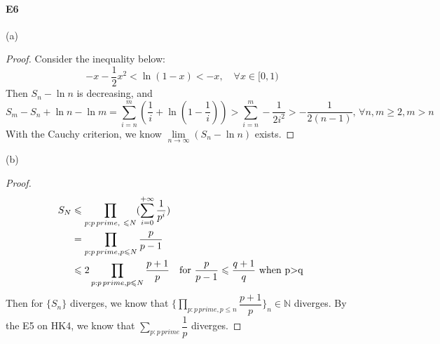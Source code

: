 \documentclass{article}
\begin{document}
\paragraph{E6}
(a)\begin{proof}
    Consider the inequality below:
    \[-x-\frac{1}{2}x^2<\ln (1-x)<-x,\quad\forall x\in[0,1)\]
    Then  $ S_n-\ln n  $ is decreasing, and 
    \[S_m-S_n+\ln n-\ln m=\sum\limits_{i=n }^{m}(\frac{1 }{i }+\ln (1-\frac{1 }{i}))>\sum\limits_{i=n}^{m} -\frac{1}{2i^2}>-\frac{1 }{2(n-1)}, \,\forall n,m\geqslant 2,m>n  \]
    With the Cauchy criterion, we know  $ \lim\limits_{n\to\infty}(S_n-\ln n)$ exists. 
\end{proof}
(b)\begin{proof}
    \begin{align*}
        S_N &\leqslant \prod \limits_{p:p\,prime,\ \leqslant N }(\sum\limits_{i=0}^{+\infty}\frac{1}{p^i} )\\
        &=\prod\limits_{p:p\,prime,p \leqslant N }\frac{p}{p-1}\\
        & \leqslant 2\prod\limits_{p:p\,prime,p \leqslant N }\frac{p+1}{p}\quad\text{for  $ \frac{p}{p-1} \leqslant \frac{q+1}{q} $ when p>q }\\
    \end{align*}
    Then for  $ \{S_n\} $ diverges, we know that   $\{ \prod\limits_{p:p\,prime, p\leqslant n }\dfrac{p+1}{p}\}_n\in\mathbb{N} $ diverges. By the E5 on HK4, we know that  $ \sum\limits_{p:p\, prime}\dfrac{1 }{p }  $ diverges. 
\end{proof}
\end{document}
